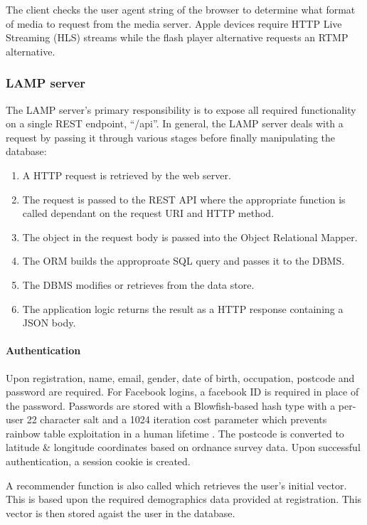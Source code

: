The client checks the user agent string of the browser to determine what format of media to request from the media server. Apple devices require HTTP Live Streaming (HLS) streams while the flash player alternative requests an RTMP alternative.

\subsubsection{LAMP server}

The LAMP server's primary responsibility is to expose all required functionality on a single REST endpoint, ``/api''. In general, the LAMP server deals with a request by passing it through various stages before finally manipulating the database:

\begin{enumerate}
	\item A HTTP request is retrieved by the web server.
	\item The request is passed to the REST API where the appropriate function is called dependant on the request URI and HTTP method.
	\item The object in the request body is passed into the Object Relational Mapper.
	\item The ORM builds the approproate SQL query and passes it to the DBMS.
	\item The DBMS modifies or retrieves from the data store.
	\item The application logic returns the result as a HTTP response containing a JSON body.
\end{enumerate}

\paragraph{Authentication}

Upon registration, name, email, gender, date of birth, occupation, postcode and password are required. For Facebook logins, a facebook ID is required in place of the password. Passwords are stored with a Blowfish-based hash type with a per-user 22 character salt and a 1024 iteration cost parameter which prevents rainbow table exploitation in a human lifetime \citep{hashing}. The postcode is converted to latitude \& longitude coordinates based on ordnance survey data. Upon successful authentication, a session cookie is created.

A recommender function is also called which retrieves the user's initial vector. This is based upon the required demographics data provided at registration. This vector is then stored agaist the user in the database.

